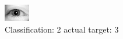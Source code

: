 \begin{figure}[h!]
\begin{center}
\includegraphics[width=0.60\columnwidth]{figures/ID3094_class_2_target_3.png}
\end{center}
\caption{ Classification: 2 actual target: 3}
\label{fig:ID3094_class_2_target_3}
\end{figure}
